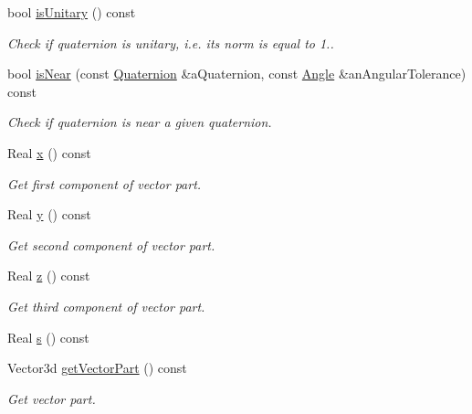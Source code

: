 \begin{DoxyCompactItemize}
bool \hyperlink{classostk_1_1math_1_1geom_1_1d3_1_1trf_1_1rot_1_1_quaternion_a4e1cafc25046da2cf605694b96066770}{is\+Unitary} () const
\begin{DoxyCompactList}\small\item\em Check if quaternion is unitary, i.\+e. its norm is equal to 1.. \end{DoxyCompactList}\item 
bool \hyperlink{classostk_1_1math_1_1geom_1_1d3_1_1trf_1_1rot_1_1_quaternion_abb1535e6e8cfbe38dd7ce4e153374962}{is\+Near} (const \hyperlink{classostk_1_1math_1_1geom_1_1d3_1_1trf_1_1rot_1_1_quaternion}{Quaternion} \&a\+Quaternion, const \hyperlink{classostk_1_1math_1_1geom_1_1_angle}{Angle} \&an\+Angular\+Tolerance) const
\begin{DoxyCompactList}\small\item\em Check if quaternion is near a given quaternion. \end{DoxyCompactList}\item 
Real \hyperlink{classostk_1_1math_1_1geom_1_1d3_1_1trf_1_1rot_1_1_quaternion_a894bf65f86e57876fb498dd1fffc458d}{x} () const
\begin{DoxyCompactList}\small\item\em Get first component of vector part. \end{DoxyCompactList}\item 
Real \hyperlink{classostk_1_1math_1_1geom_1_1d3_1_1trf_1_1rot_1_1_quaternion_a7b480255c61d24f59446e0f1664ca070}{y} () const
\begin{DoxyCompactList}\small\item\em Get second component of vector part. \end{DoxyCompactList}\item 
Real \hyperlink{classostk_1_1math_1_1geom_1_1d3_1_1trf_1_1rot_1_1_quaternion_a0bb2ccff6bafbafc61232574584fb65d}{z} () const
\begin{DoxyCompactList}\small\item\em Get third component of vector part. \end{DoxyCompactList}\item 
Real \hyperlink{classostk_1_1math_1_1geom_1_1d3_1_1trf_1_1rot_1_1_quaternion_ab53045f72736712ac53e4def941a196a}{s} () const
\item 
Vector3d \hyperlink{classostk_1_1math_1_1geom_1_1d3_1_1trf_1_1rot_1_1_quaternion_a88ec3b0a13fe2f708eb1955a97866a36}{get\+Vector\+Part} () const
\begin{DoxyCompactList}\small\item\em Get vector part. \end{DoxyCompactList}\item 

\end{DoxyCompactItemize}
